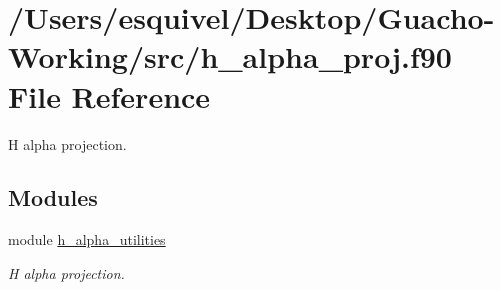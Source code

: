 \hypertarget{h__alpha__proj_8f90}{}\section{/\+Users/esquivel/\+Desktop/\+Guacho-\/\+Working/src/h\+\_\+alpha\+\_\+proj.f90 File Reference}
\label{h__alpha__proj_8f90}


H alpha projection.  


\subsection*{Modules}
\begin{DoxyCompactItemize}
\item 
module \hyperlink{namespaceh__alpha__utilities}{h\+\_\+alpha\+\_\+utilities}
\begin{DoxyCompactList}\small\item\em H alpha projection. \end{DoxyCompactList}\end{DoxyCompactItemize}
